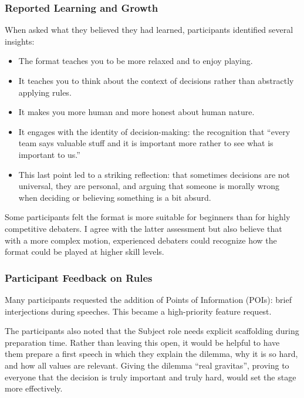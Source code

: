 \documentclass[12pt]{article}
\begin{document}
\subsubsection{Reported Learning and Growth}

When asked what they believed they had learned, participants identified several insights:

\begin{itemize}
    \item The format teaches you to be more relaxed and to enjoy playing.
    \item It teaches you to think about the context of decisions rather than abstractly applying rules.
    \item It makes you more human and more honest about human nature.
    \item It engages with the identity of decision-making: the recognition that ``every team says valuable stuff and it is important more rather to see what is important to us.''
    \item This last point led to a striking reflection: that sometimes decisions are not universal, they are personal, and arguing that someone is morally wrong when deciding or believing something is a bit absurd.
\end{itemize}

Some participants felt the format is more suitable for beginners than for highly competitive debaters. I agree with the latter assessment but also believe that with a more complex motion, experienced debaters could recognize how the format could be played at higher skill levels.

\subsubsection{Participant Feedback on Rules}

Many participants requested the addition of Points of Information (POIs): brief interjections during speeches. This became a high-priority feature request.

The participants also noted that the Subject role needs explicit scaffolding during preparation time. Rather than leaving this open, it would be helpful to have them prepare a first speech in which they explain the dilemma, why it is so hard, and how all values are relevant. Giving the dilemma ``real gravitas'', proving to everyone that the decision is truly important and truly hard, would set the stage more effectively.
\end{document}

